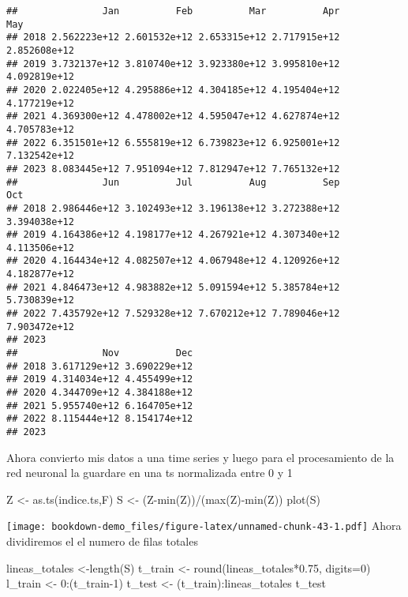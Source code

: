 \documentclass[
]{book}
\newenvironment{Shaded}{\begin{snugshade}}{\end{snugshade}}
\newcommand{\AttributeTok}[1]{\textcolor[rgb]{0.77,0.63,0.00}{#1}}
\newcommand{\DecValTok}[1]{\textcolor[rgb]{0.00,0.00,0.81}{#1}}
\newcommand{\FloatTok}[1]{\textcolor[rgb]{0.00,0.00,0.81}{#1}}
\newcommand{\FunctionTok}[1]{\textcolor[rgb]{0.00,0.00,0.00}{#1}}
\newcommand{\NormalTok}[1]{#1}
\newcommand{\OtherTok}[1]{\textcolor[rgb]{0.56,0.35,0.01}{#1}}
\newcommand{\SpecialCharTok}[1]{\textcolor[rgb]{0.00,0.00,0.00}{#1}}
\begin{document}
\begin{verbatim}
##               Jan          Feb          Mar          Apr          May
## 2018 2.562223e+12 2.601532e+12 2.653315e+12 2.717915e+12 2.852608e+12
## 2019 3.732137e+12 3.810740e+12 3.923380e+12 3.995810e+12 4.092819e+12
## 2020 2.022405e+12 4.295886e+12 4.304185e+12 4.195404e+12 4.177219e+12
## 2021 4.369300e+12 4.478002e+12 4.595047e+12 4.627874e+12 4.705783e+12
## 2022 6.351501e+12 6.555819e+12 6.739823e+12 6.925001e+12 7.132542e+12
## 2023 8.083445e+12 7.951094e+12 7.812947e+12 7.765132e+12             
##               Jun          Jul          Aug          Sep          Oct
## 2018 2.986446e+12 3.102493e+12 3.196138e+12 3.272388e+12 3.394038e+12
## 2019 4.164386e+12 4.198177e+12 4.267921e+12 4.307340e+12 4.113506e+12
## 2020 4.164434e+12 4.082507e+12 4.067948e+12 4.120926e+12 4.182877e+12
## 2021 4.846473e+12 4.983882e+12 5.091594e+12 5.385784e+12 5.730839e+12
## 2022 7.435792e+12 7.529328e+12 7.670212e+12 7.789046e+12 7.903472e+12
## 2023                                                                 
##               Nov          Dec
## 2018 3.617129e+12 3.690229e+12
## 2019 4.314034e+12 4.455499e+12
## 2020 4.344709e+12 4.384188e+12
## 2021 5.955740e+12 6.164705e+12
## 2022 8.115444e+12 8.154174e+12
## 2023
\end{verbatim}

Ahora convierto mis datos a una time series y luego para el procesamiento de la red neuronal la guardare en una ts normalizada entre 0 y 1

\begin{Shaded}
\begin{Highlighting}[]
\NormalTok{Z }\OtherTok{\textless{}{-}} \FunctionTok{as.ts}\NormalTok{(indice.ts,F)}
\NormalTok{S }\OtherTok{\textless{}{-}}\NormalTok{ (Z}\SpecialCharTok{{-}}\FunctionTok{min}\NormalTok{(Z))}\SpecialCharTok{/}\NormalTok{(}\FunctionTok{max}\NormalTok{(Z)}\SpecialCharTok{{-}}\FunctionTok{min}\NormalTok{(Z))}
\FunctionTok{plot}\NormalTok{(S)}
\end{Highlighting}
\end{Shaded}

\texttt{[image: bookdown-demo\_files/figure-latex/unnamed-chunk-43-1.pdf]}
Ahora dividiremos el el numero de filas totales

\begin{Shaded}
\begin{Highlighting}[]
\NormalTok{lineas\_totales }\OtherTok{\textless{}{-}}\FunctionTok{length}\NormalTok{(S)}
\NormalTok{t\_train }\OtherTok{\textless{}{-}} \FunctionTok{round}\NormalTok{(lineas\_totales}\SpecialCharTok{*}\FloatTok{0.75}\NormalTok{, }\AttributeTok{digits=}\DecValTok{0}\NormalTok{)}
\NormalTok{l\_train }\OtherTok{\textless{}{-}} \DecValTok{0}\SpecialCharTok{:}\NormalTok{(t\_train}\DecValTok{{-}1}\NormalTok{) }
\NormalTok{t\_test }\OtherTok{\textless{}{-}}\NormalTok{ (t\_train)}\SpecialCharTok{:}\NormalTok{lineas\_totales}
\NormalTok{t\_test}
\end{Highlighting}
\end{Shaded}
\end{document}
